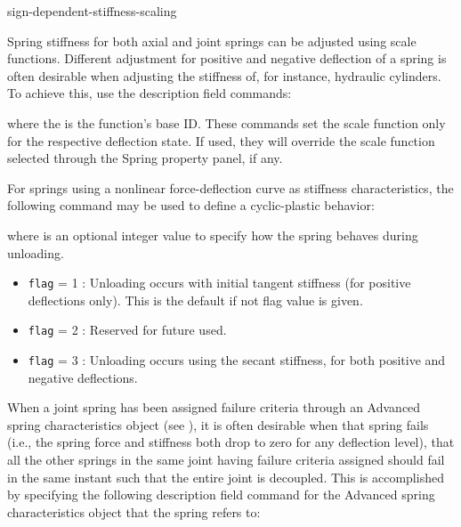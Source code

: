 
           {sign-dependent-stiffness-scaling}

Spring stiffness for both axial and joint springs can be adjusted using
scale functions. Different adjustment for positive and negative deflection of
a spring is often desirable when adjusting the stiffness of, for instance,
hydraulic cylinders. To achieve this, use the description field commands:

\medskip
{}

\medskip

\noindent
where the {\tt{}} is the function's base ID.
These commands set the scale function only for the respective deflection state.
If used, they will override the scale function selected through the Spring
property panel, if any.




For springs using a nonlinear force-deflection curve as stiffness
characteristics, the following command may be used to define a
cyclic-plastic behavior:


\noindent
where {\tt{}} is an optional integer value to specify how
the spring behaves during unloading.

\begin{itemize}
\item{\tt flag} = 1 : Unloading occurs with initial tangent stiffness (for
  positive deflections only). This is the default if not flag value is given.
\item{\tt flag} = 2 : Reserved for future used.
\item{\tt flag} = 3 : Unloading occurs using the secant stiffness,
  for both positive and negative deflections.
\end{itemize}



When a joint spring has been assigned failure criteria through an
Advanced spring characteristics object (see
),
it is often desirable when that spring fails (i.e., the spring force and
stiffness both drop to zero for any deflection level), that all the other
springs in the same joint having failure criteria assigned should fail in the
same instant such that the entire joint is decoupled.
This is accomplished by specifying the following description field command for
the Advanced spring characteristics object that the spring refers to:

